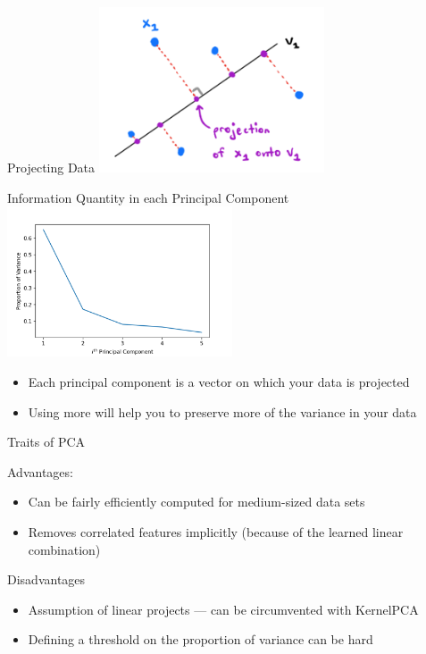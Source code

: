 \documentclass[aspectratio=169]{../latex_main/tntbeamer}  %
\begin{document}
	\begin{frame}{Projecting Data}
        \centering
        \includegraphics[width=0.5\textwidth]{Bild9.PNG}
	\end{frame}
	
	\begin{frame}{Information Quantity in each Principal Component}
        \centering
        \includegraphics[width=0.5\textwidth]{Bild13.PNG}
        
        \begin{itemize}
            \item Each principal component is a vector on which your data is projected
            \item Using more will help you to preserve more of the variance in your data
        \end{itemize}
        
	\end{frame}
	
	\begin{frame}{Traits of PCA}

    Advantages:
    \begin{itemize}
        \item Can be fairly efficiently computed for medium-sized data sets
        \item Removes correlated features implicitly (because of the learned linear combination)
    \end{itemize}
    
    Disadvantages
    \begin{itemize}
        \item Assumption of linear projects --- can be circumvented with KernelPCA
        \item Defining a threshold on the proportion of variance can be hard
    \end{itemize}


	\end{frame}
	
	
\end{document}
